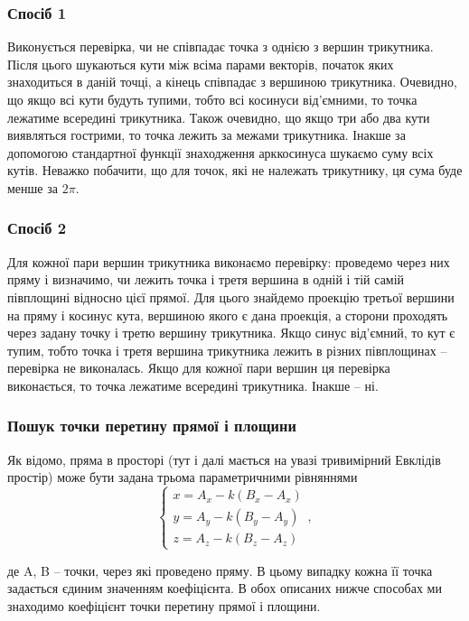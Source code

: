 \documentclass[a4paper,12pt]{article}
\begin{document}
\subsubsection*{Спосіб 1}

 Виконується перевірка, чи не співпадає точка з однією з вершин трикутника. Після цього шукаються кути між всіма парами векторів, початок яких знаходиться в даній точці, а кінець співпадає з вершиною трикутника. Очевидно, що якщо всі кути будуть тупими, тобто всі косинуси від’ємними, то точка лежатиме всередині трикутника. Також очевидно, що якщо три або два кути виявляться гострими, то точка лежить за межами трикутника. Інакше за допомогою стандартної функції знаходження арккосинуса шукаємо суму всіх кутів. Неважко побачити, що для точок, які не належать трикутнику, ця сума буде менше за $2\pi$.

\subsubsection*{Спосіб 2}

 Для кожної пари вершин трикутника виконаємо перевірку: проведемо через них пряму і визначимо, чи лежить точка і третя вершина в одній і тій самій півплощині відносно цієї прямої. Для цього знайдемо проекцію третьої вершини на пряму і косинус кута, вершиною якого є дана проекція, а сторони проходять через задану точку і третю вершину трикутника. Якщо синус від’ємний, то кут є тупим, тобто точка і третя вершина трикутника лежить в різних півплощинах -- перевірка не виконалась. Якщо для кожної пари вершин ця перевірка виконається, то точка лежатиме всередині трикутника. Інакше -- ні.

\subsubsection{Пошук точки перетину прямої і площини} \label{sec:intersections}
Як відомо, пряма в просторі (тут і далі мається на увазі тривимірний Евклідів простір) може бути задана трьома параметричними рівняннями
\begin{equation} \label{eq:line}
  \begin{cases}
    x = A_x - k(B_x - A_x) \\
    y = A_y - k(B_y - A_y) \\
    z = A_z - k(B_z - A_z)
  \end{cases},
\end{equation}

де A, B -- точки, через які проведено пряму. В цьому випадку кожна її точка задається єдиним значенням коефіцієнта. В обох описаних нижче способах ми знаходимо коефіцієнт точки перетину прямої і площини.
\end{document}
